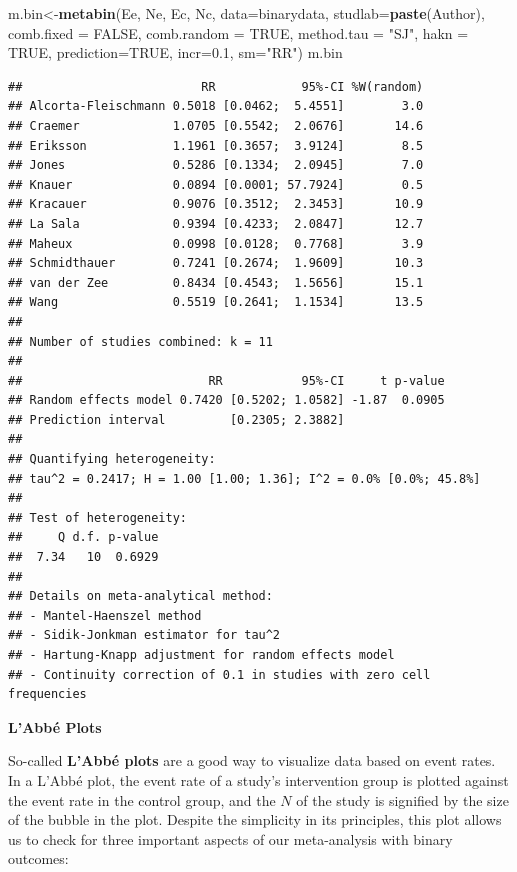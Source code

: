 \documentclass[]{book}
\newenvironment{Shaded}{\begin{snugshade}}{\end{snugshade}}
\newcommand{\DataTypeTok}[1]{\textcolor[rgb]{0.13,0.29,0.53}{#1}}
\newcommand{\FloatTok}[1]{\textcolor[rgb]{0.00,0.00,0.81}{#1}}
\newcommand{\KeywordTok}[1]{\textcolor[rgb]{0.13,0.29,0.53}{\textbf{#1}}}
\newcommand{\NormalTok}[1]{#1}
\newcommand{\OtherTok}[1]{\textcolor[rgb]{0.56,0.35,0.01}{#1}}
\newcommand{\StringTok}[1]{\textcolor[rgb]{0.31,0.60,0.02}{#1}}
\begin{document}
\begin{Shaded}
\begin{Highlighting}[]
\NormalTok{m.bin<-}\KeywordTok{metabin}\NormalTok{(Ee,}
\NormalTok{        Ne,}
\NormalTok{        Ec,}
\NormalTok{        Nc,}
        \DataTypeTok{data=}\NormalTok{binarydata,}
        \DataTypeTok{studlab=}\KeywordTok{paste}\NormalTok{(Author),}
        \DataTypeTok{comb.fixed =} \OtherTok{FALSE}\NormalTok{,}
        \DataTypeTok{comb.random =} \OtherTok{TRUE}\NormalTok{,}
        \DataTypeTok{method.tau =} \StringTok{"SJ"}\NormalTok{,}
        \DataTypeTok{hakn =} \OtherTok{TRUE}\NormalTok{,}
        \DataTypeTok{prediction=}\OtherTok{TRUE}\NormalTok{,}
        \DataTypeTok{incr=}\FloatTok{0.1}\NormalTok{,}
        \DataTypeTok{sm=}\StringTok{"RR"}\NormalTok{)}
\NormalTok{m.bin}
\end{Highlighting}
\end{Shaded}

\begin{verbatim}
##                         RR            95%-CI %W(random)
## Alcorta-Fleischmann 0.5018 [0.0462;  5.4551]        3.0
## Craemer             1.0705 [0.5542;  2.0676]       14.6
## Eriksson            1.1961 [0.3657;  3.9124]        8.5
## Jones               0.5286 [0.1334;  2.0945]        7.0
## Knauer              0.0894 [0.0001; 57.7924]        0.5
## Kracauer            0.9076 [0.3512;  2.3453]       10.9
## La Sala             0.9394 [0.4233;  2.0847]       12.7
## Maheux              0.0998 [0.0128;  0.7768]        3.9
## Schmidthauer        0.7241 [0.2674;  1.9609]       10.3
## van der Zee         0.8434 [0.4543;  1.5656]       15.1
## Wang                0.5519 [0.2641;  1.1534]       13.5
## 
## Number of studies combined: k = 11
## 
##                          RR           95%-CI     t p-value
## Random effects model 0.7420 [0.5202; 1.0582] -1.87  0.0905
## Prediction interval         [0.2305; 2.3882]              
## 
## Quantifying heterogeneity:
## tau^2 = 0.2417; H = 1.00 [1.00; 1.36]; I^2 = 0.0% [0.0%; 45.8%]
## 
## Test of heterogeneity:
##     Q d.f. p-value
##  7.34   10  0.6929
## 
## Details on meta-analytical method:
## - Mantel-Haenszel method
## - Sidik-Jonkman estimator for tau^2
## - Hartung-Knapp adjustment for random effects model
## - Continuity correction of 0.1 in studies with zero cell frequencies
\end{verbatim}

\textbf{L'Abbé Plots}

So-called \textbf{L'Abbé plots} \citep{labbe} are a good way to visualize data based on event rates. In a L'Abbé plot, the event rate of a study's intervention group is plotted against the event rate in the control group, and the \(N\) of the study is signified by the size of the bubble in the plot. Despite the simplicity in its principles, this plot allows us to check for three important aspects of our meta-analysis with binary outcomes:
\end{document}
